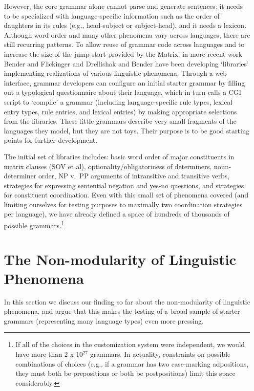 \documentclass[11pt]{article}
\begin{document}
However, the core grammar alone cannot parse and generate sentences:
it needs to be specialized with language-specific information such as
the order of daughters in its rules (e.g., head-subject or
subject-head), and it needs a lexicon.  Although word order and many
other phenomena vary across languages, there are still recurring
patterns.  To allow reuse of grammar code across languages and to
increase the size of the jump-start provided by the Matrix, in more
recent work Bender and Flickinger  and
Drellishak and Bender  have been developing
`libraries' implementing realizations of various linguistic phenomena.
Through a web interface, grammar developers can configure an initial
starter grammar by filling out a typological questionnaire about their
language, which in turn calls a CGI script to `compile' a grammar
(including language-specific rule types, lexical entry types, rule
entries, and lexical entries) by making appropriate selections from
the libraries. These little grammars describe very small fragments of
the languages they model, but they are not toys.  Their purpose is to
be good starting points for further development.

The initial set of libraries includes: basic word order of major
constituents in matrix clauses (SOV et al), optionality/obligatoriness
of determiners, noun-determiner order, NP v.\ PP arguments of
intransitive and transitive verbs, strategies for expressing
sentential negation and yes-no questions, and strategies for
constituent coordination.  Even with this small set of phenomena
covered (and limiting ourselves for testing purposes to 
maximally two coordination strategies per language), we have already
defined a space of hundreds of thousands of possible
grammars.\footnote{If all of the choices in the customization system
were independent, we would have more than 2 x 10$^{27}$ grammars.  In
actuality, constraints on possible combinations of choices (e.g., if a
grammar has two case-marking adpositions, they must both be
prepositions or both be postpositions) limit this space considerably.}

\section{The Non-modularity of Linguistic Phenomena}

In this section we discuss our finding so far about the
non-modularity of linguistic phenomena, and argue that this
makes the testing of a broad sample of starter grammars (representing
many language types) even more pressing.
\end{document}
